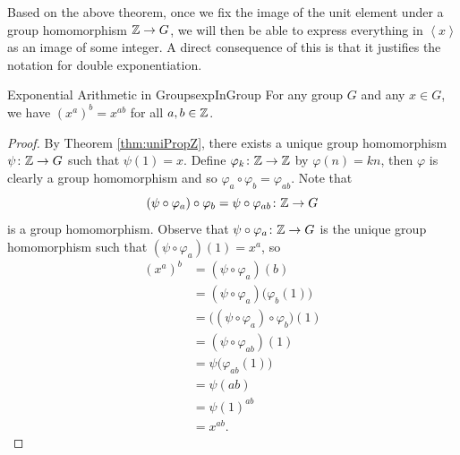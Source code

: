 \documentclass[math]{amznotes}
\theoremstyle{remark}
\newcommand{\cyclic}[1]{\left\langle#1\right\rangle}
\newcommand{\0}{\mathbf{0}}
\newcommand{\1}{\mathbf{1}}
\begin{document}
Based on the above theorem, once we fix the image of the unit element under a group homomorphism $\mathbb{Z} \to G$, we will then be able to express everything in $\cyclic{x}$ as an image of some integer. A direct consequence of this is that it justifies the notation for double exponentiation.
\begin{corbox}{Exponential Arithmetic in Groups}{expInGroup}
    For any group $G$ and any $x \in G$, we have $\left(x^a\right)^b = x^{ab}$ for all $a, b \in \mathbb{Z}$.
    \tcblower
    \begin{proof}
        By Theorem \ref{thm:uniPropZ}, there exists a unique group homomorphism $\psi \colon \mathbb{Z} \to G$ such that $\psi\left(1\right) = x$. Define $\varphi_k \colon \mathbb{Z} \to \mathbb{Z}$ by $\varphi\left(n\right) = kn$, then $\varphi$ is clearly a group homomorphism and so $\varphi_{a} \circ \varphi_b = \varphi_{ab}$. Note that 
        \begin{equation*}
            \left(\psi \circ \varphi_a\right) \circ \varphi_b = \psi \circ \varphi_{ab} \colon \mathbb{Z} \to G
        \end{equation*}
        is a group homomorphism. Observe that $\psi \circ \varphi_a \colon \mathbb{Z} \to G$ is the unique group homomorphism such that $\left(\psi \circ \varphi_a\right)\left(1\right) = x^a$, so 
        \begin{align*}
            \left(x^a\right)^b & = \left(\psi \circ \varphi_a\right)\left(b\right) \\
            & = \left(\psi \circ \varphi_a\right)\bigl(\varphi_b\left(1\right)\bigr) \\
            & = \bigl(\left(\psi \circ \varphi_a\right) \circ \varphi_b\bigr)\left(1\right) \\
            & = \left(\psi \circ \varphi_{ab}\right)\left(1\right) \\
            & = \psi\bigl(\varphi_{ab}\left(1\right)\bigr) \\
            & = \psi\left(ab\right) \\
            & = \psi\left(1\right)^{ab} \\
            & = x^{ab}. 
        \end{align*} 
    \end{proof}
\end{corbox}
\end{document}
